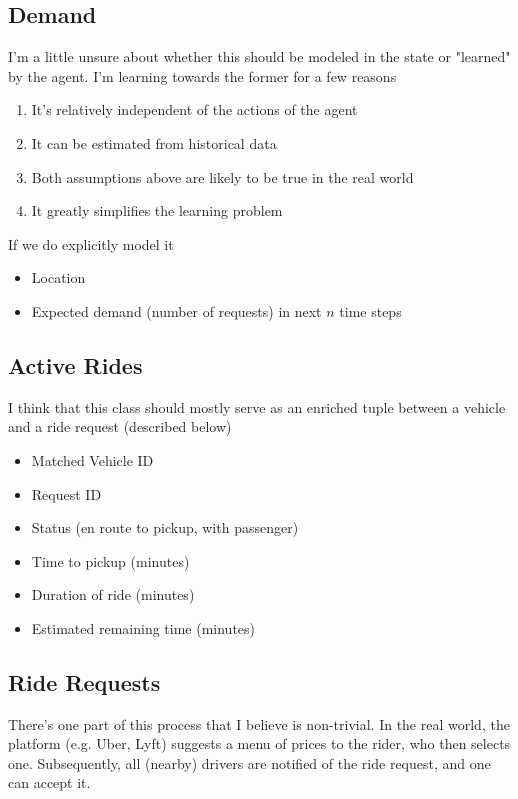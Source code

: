 \documentclass[12pt]{article}
\begin{document}
\medskip
\subsection*{Demand}
I'm a little unsure about whether this should be  modeled in the state or
"learned" by the
agent. I'm learning towards the former for a few reasons
\begin{enumerate}
		\item It's relatively independent of the actions of the agent
		\item It can be estimated from historical data
		\item Both assumptions above are likely to be true in the real world
		\item It greatly simplifies the learning problem
\end{enumerate}
If we do explicitly model it
\begin{itemize}
		\item Location
		\item Expected demand (number of requests) in next $n$ time steps
\end{itemize}

\medskip
\subsection*{Active Rides}
I think that this class should mostly serve as an enriched tuple between a vehicle and a
ride request (described below)
\begin{itemize}
		\item Matched Vehicle ID
		\item Request ID
		\item Status (en route to pickup, with passenger)
		\item Time to pickup (minutes)
		\item Duration of ride (minutes)
		\item Estimated remaining time (minutes)
\end{itemize}

\medskip
\subsection*{Ride Requests}

There's one part of this process that I believe is non-trivial. In the real world, the
platform (e.g. Uber, Lyft) suggests a menu of prices to the rider, who then selects one.
Subsequently, all (nearby) drivers are notified of the ride request, and one can accept it.
\end{document}
